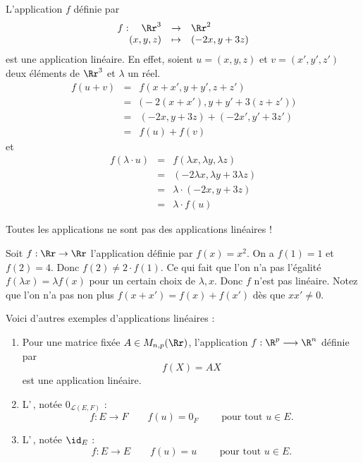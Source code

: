 \documentclass[class=report,crop=false]{standalone}
\begin{document}
\begin{exemple}
L'application $f$ définie par
$$\begin{array}{rcl}
f : \quad \Rr^3 & \to & \Rr^2\\
(x,y,z) & \mapsto & (-2x,y+3z)
 \end{array}$$
est une application linéaire. En effet, soient  $u=(x,y,z)$ et $v=(x',y',z')$
deux éléments de $\Rr^3$ et $\lambda$ un réel.
$$\begin{array}{rcl}
f(u+v) & = &f(x+x', y+y', z+z')\\
       & = & \big(-2(x+x'), y+y' + 3(z+z')\big)\\
       & = & (-2x, y+3z)+(-2x', y'+3z')\\
       & = & f(u)+f(v)
\end{array}$$
et 
$$\begin{array}{rcl}
f(\lambda \cdot u) & = & f(\lambda x, \lambda y, \lambda z)\\
             & = & (-2\lambda x,   \lambda y + 3\lambda z)\\
             & = & \lambda \cdot (-2x,y+3z)\\
             & = & \lambda \cdot f(u)
\end{array}$$
\end{exemple}


Toutes les applications ne sont pas des applications linéaires !
\begin{exemple}
Soit $f : \Rr \to \Rr$ l'application définie par $f(x)=x^2$.
On a $f(1)=1$ et $f(2)=4$. Donc $f(2) \neq 2 \cdot f(1)$. Ce qui fait
que l'on n'a pas l'égalité $f(\lambda x)=\lambda f(x)$ pour un certain choix de $\lambda,x$.
Donc $f$ n'est pas linéaire.
Notez que l'on n'a pas non plus $f(x+x')=f(x)+f(x')$ dès que $xx'\neq0$.
\end{exemple}


Voici d'autres exemples d'applications linéaires :
\begin{enumerate}
\item Pour une matrice fixée $A \in M_{n,p}(\Rr)$,
l'application $f : \R^p \longrightarrow \R^n$ définie par
$$f(X) = AX$$
est une application linéaire.

\item L'\,, notée $0_{\mathcal{L}(E,F)}$ :
$$f : E \longrightarrow F
\qquad f(u) = 0_F \qquad \text{ pour tout }u \in E.$$

\item L'\,, notée $\id_E$ :
$$f : E \longrightarrow E
\qquad f(u) = u \qquad \text{ pour tout }u \in E.$$
\end{enumerate}
\end{document}

